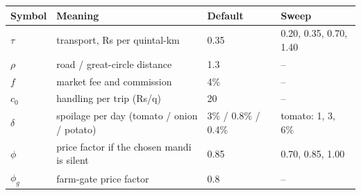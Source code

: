 \begin{tabular}{llll}
\toprule
Symbol & Meaning & Default & Sweep\\
\midrule
$\tau$ & transport, Rs per quintal-km & 0.35 & 0.20, 0.35, 0.70, 1.40\\
$\rho$ & road / great-circle distance & 1.3 & --\\
$f$ & market fee and commission & 4\% & --\\
$c_0$ & handling per trip (Rs/q) & 20 & --\\
$\delta$ & spoilage per day (tomato / onion / potato) & 3\% / 0.8\% / 0.4\% & tomato: 1, 3, 6\%\\
$\phi$ & price factor if the chosen mandi is silent & 0.85 & 0.70, 0.85, 1.00\\
$\phi_g$ & farm-gate price factor & 0.8 & --\\
\bottomrule
\end{tabular}